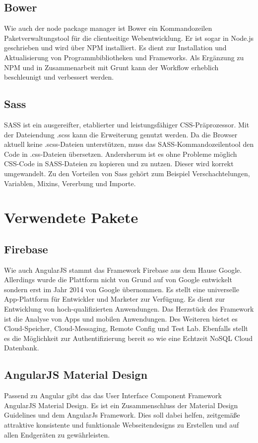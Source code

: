 \subsection{Bower}
Wie auch der node package manager ist Bower ein Kommandozeilen Paketverwaltungstool für die clientseitige Webentwicklung. Er ist sogar in Node.js geschrieben und wird über NPM installiert. Es dient zur Installation und Aktualisierung von Programmbibliotheken und Frameworks. Als Ergänzung zu NPM und in Zusammenarbeit mit Grunt kann der Workflow erheblich beschleunigt und verbessert werden. 

\subsection{Sass}
SASS ist ein ausgereifter, etablierter und leistungsfähiger CSS-Präprozessor. Mit der Dateiendung .scss kann die Erweiterung genutzt werden. Da die Browser aktuell keine .scss-Dateien unterstützen, muss das SASS-Kommandozeilentool den Code in .css-Dateien übersetzen.  Andersherum ist es ohne Probleme möglich CSS-Code in SASS-Dateien zu kopieren und zu nutzen. Dieser wird korrekt umgewandelt. Zu den Vorteilen von Sass gehört zum Beispiel Verschachtelungen, Variablen, Mixins, Vererbung und Importe.

\section{Verwendete Pakete}
\subsection{Firebase}
Wie auch AngularJS stammt das Framework Firebase aus dem Hause Google. Allerdings wurde die Plattform nicht von Grund auf von Google entwickelt sondern erst im Jahr 2014 von Google übernommen. Es stellt eine universelle App-Plattform für Entwickler und Marketer zur Verfügung. Es dient zur Entwicklung von hoch-qualifizierten Anwendungen. Das Herzstück des Framework ist die Analyse von Apps und mobilen Anwendungen. Des Weiteren bietet es Cloud-Speicher, Cloud-Messaging, Remote Config und Test Lab. Ebenfalls stellt es die Möglichkeit zur Authentifizierung bereit so wie eine Echtzeit NoSQL Cloud Datenbank. 

\subsection{AngularJS Material Design}
Passend zu Angular gibt das das User Interface Component Framework AngularJS Material Design. Es ist ein Zusammenschluss der Material Design Guidelines und dem AngularJs Framework. Dies soll dabei helfen, zeitgemäße attraktive konsistente und funktionale  Webseitendesigns zu Erstellen und auf allen Endgeräten zu gewährleisten.

